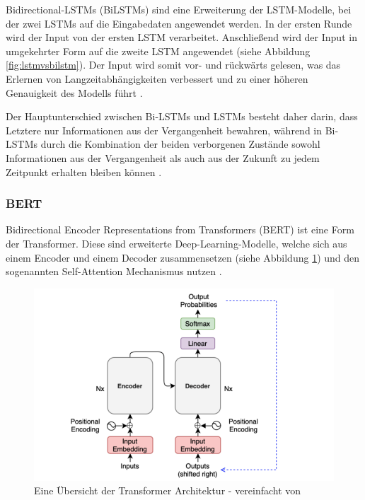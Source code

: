 Bidirectional-LSTMs (BiLSTMs) sind eine Erweiterung der LSTM-Modelle, bei der zwei LSTMs auf die Eingabedaten angewendet werden. 
In der ersten Runde wird der Input von der ersten LSTM verarbeitet. Anschließend wird der Input in umgekehrter Form auf die zweite LSTM
angewendet (siehe Abbildung \ref{fig:lstmvsbilstm}). Der Input wird somit vor- und rückwärts gelesen, was das Erlernen von 
Langzeitabhängigkeiten verbessert und zu einer höheren Genauigkeit des Modells führt \cite{siaminamini2019}. 

Der Hauptunterschied zwischen Bi-LSTMs und LSTMs besteht daher darin, dass Letztere nur 
Informationen aus der Vergangenheit bewahren, während in Bi-LSTMs durch die Kombination der beiden verborgenen Zustände sowohl Informationen 
aus der Vergangenheit als auch aus der Zukunft zu jedem Zeitpunkt erhalten bleiben können \cite{shen2021}.


\subsubsection{BERT}

Bidirectional Encoder Representations from Transformers (BERT) ist eine Form der Transformer.
Diese sind erweiterte Deep-Learning-Modelle, welche sich aus einem Encoder und einem Decoder zusammensetzen (siehe Abbildung 
\ref{fig:transformeroverview}) und den sogenannten Self-Attention Mechanismus nutzen \cite{vaswani2023attentionneed}.

\begin{figure}[htbp]
    \begin{center}
    \includegraphics[scale=0.4]{static/transformer-overview.png}
    \caption{\label{fig:transformeroverview} Eine Übersicht der Transformer Architektur \cite{kikaben2021transformer} 
    - vereinfacht von \cite{vaswani2023attentionneed}}
    \end{center}
\end{figure}

